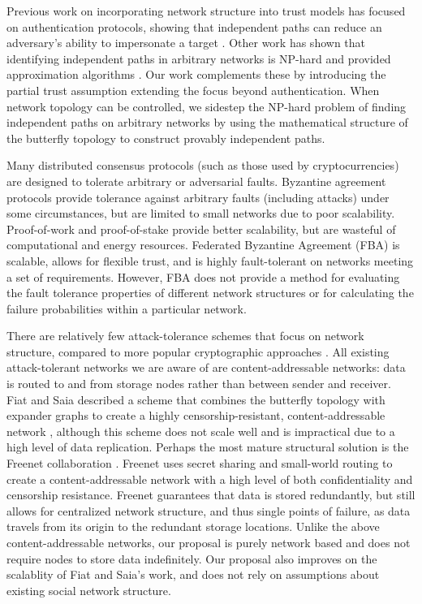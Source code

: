 \documentclass[twocolumn]{article}
\begin{document}
Previous work on incorporating network structure into
trust models has focused on authentication
protocols, showing that independent paths can reduce an adversary's ability
to impersonate a target
\cite{levien_attack-resistant_2009}.
Other work has shown that identifying independent paths in arbitrary networks
is NP-hard and provided approximation algorithms
\cite{reiter_resilient_1998}.
Our work complements these by introducing the partial trust assumption
extending the focus beyond authentication.
When network topology can be controlled, we sidestep the NP-hard problem of finding
independent paths on arbitrary networks by using the mathematical structure of
the butterfly topology to construct provably independent paths.

Many distributed consensus protocols (such as those used by cryptocurrencies)
are designed to tolerate arbitrary or adversarial faults.
Byzantine agreement protocols
\cite{lamport_byzantine_1982,castro_practical_1999}
provide tolerance against arbitrary faults (including attacks) under
some circumstances, but are limited to small networks due to poor scalability.
Proof-of-work \cite{dwork_pricing_1993,nakamoto_bitcoin:_2008}
and proof-of-stake \cite{king_ppcoin:_2012}
provide better scalability,
but are wasteful of computational and energy resources.
Federated Byzantine Agreement (FBA) \cite{mazieres_stellar_2015}
is scalable, allows for flexible trust,
and is highly fault-tolerant on networks meeting a set of requirements.
However, FBA does not provide a method for evaluating the
fault tolerance properties of different network structures
or for calculating the failure probabilities within a particular network.

There are relatively few attack-tolerance schemes
that focus on network structure,
compared to more popular cryptographic approaches
\cite{ferguson_practical_2003}.
All existing attack-tolerant networks we are aware of are content-addressable
networks: data is routed to and from storage nodes rather than between sender
and receiver.
Fiat and Saia described a scheme that combines the butterfly topology
with expander graphs to create a highly censorship-resistant,
content-addressable network \cite{fiat_censorship_2002},
although this scheme does not scale well and is impractical due to a
high level of data replication.
Perhaps the most mature structural solution is the Freenet collaboration
\cite{clarke_freenet:_2001}.
Freenet uses secret sharing
\cite{shamir_how_1979, blakley_safeguarding_1979}
and small-world routing
\cite{zhang_using_2002,kleinberg_small-world_2000}
to create a content-addressable network with a high level of both
confidentiality and censorship resistance.
Freenet guarantees that data is stored redundantly,
but still allows for centralized network structure,
and thus single points of failure,
as data travels from its origin to the redundant storage locations.
Unlike the above content-addressable networks, our proposal is purely network based
and does not require nodes to store data indefinitely.
Our proposal also improves on the scalablity of Fiat and Saia's work,
and does not rely on assumptions about existing social network structure.
\end{document}
